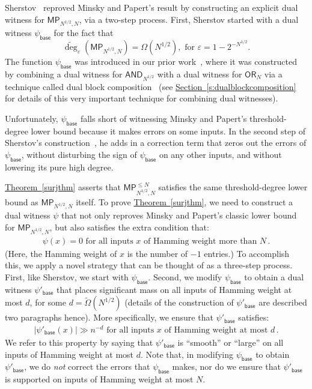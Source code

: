 \documentclass[11pt]{article}
\numberwithin{equation}{section}
\theoremstyle{definition}
\theoremstyle{plain}
\newcommand{\expref}[2]{\hyperref[#2]{#1~\ref{#2}}}
\newcommand{\OR}{\mathsf{ OR}}
\newcommand{\eps}{\varepsilon}
\newcommand{\adeg}{\widetilde{\operatorname{deg}}}
\newcommand{\AND}{\mathsf{AND}}
\begin{document}
Sherstov~\cite{sherstov15} reproved Minsky and Papert's result by constructing an explicit dual witness for $\mathsf{MP}_{N^{1/2}, N}$, via
a two-step process. First, Sherstov started with a dual witness $\psi_{\textsf{base}}$ for the fact that 
$$\adeg_{\eps}(\mathsf{MP}_{N^{1/2}, N}) =\Omega(N^{1/2}), \text{ for } \eps=1-2^{-N^{1/2}}.$$
The function $\psi_{\textsf{base}}$ was introduced
in our prior work~\cite{bt14}, where it was constructed by combining a dual witness for $\AND_{N^{1/2}}$ with
a dual witness for $\OR_{N}$ via a technique called dual block composition~\cite{shizhu, lee, sherstovhalfspaces1} (see \expref{Section}{s:dualblockcomposition} for details of this 
very important technique for combining dual witnesses). 

Unfortunately, $\psi_{\textsf{base}}$ falls short of witnessing Minsky and Papert's threshold-degree %
lower bound
because it makes errors on some inputs. In the second step of Sherstov's construction~\cite{sherstov15}, he adds in a correction term that zeros out the errors of $\psi_{\textsf{base}}$, without disturbing
the sign of $\psi_{\textsf{base}}$ on any other inputs, and without lowering its pure high degree.

\expref{Theorem}{surjthm} asserts that $\mathsf{MP}_{N^{1/2}, N}^{\leq N}$ satisfies the same threshold-degree %
lower bound as 
$\mathsf{MP}_{N^{1/2}, N}$ itself. To prove \expref{Theorem}{surjthm}, we need to construct a dual witness $\psi$ that not only reproves Minsky and Papert's
classic lower bound for $\mathsf{MP}_{N^{1/2}, N}$, but also satisfies the extra condition that:
\begin{align} \label{howhowhow} \psi(x)=0 \text{ for all inputs } x \text{ of Hamming weight more than } N\,.\end{align}
(Here, the Hamming weight of $x$ is the number of $-1$ entries.) To accomplish this, we apply a novel strategy that can be thought
of as a three-step process. First, like Sherstov, we start with $\psi_{\textsf{base}}$. Second, we modify $\psi_{\textsf{base}}$
to obtain a dual witness $\psi'_{\textsf{base}}$ that places significant mass on all inputs of Hamming weight at most $d$, for some $d=\tilde{\Omega}(N^{1/2})$
(details of the construction of $\psi'_{\textsf{base}}$ are described two paragraphs hence).
More specifically, we ensure that $\psi'_{\textsf{base}}$  satisfies:
%
\begin{align} \label{noreallythispaperisntgood} |\psi'_{\textsf{base}}(x)| \gg n^{-d}  \text{ for all inputs } x \text{ of Hamming weight at most } d\,. \end{align}
%
We refer to this property by saying that $\psi'_{\textsf{base}}$ is ``smooth'' or ``large'' on all inputs of Hamming weight at most $d$.
Note that, in modifying $\psi_{\textsf{base}}$ to obtain $\psi'_{\textsf{base}}$, we do \emph{not} correct the errors that $\psi_{\textsf{base}}$ makes, nor do we ensure that $\psi'_{\textsf{base}}$
is supported on inputs of Hamming weight at most $N$.
\end{document}
